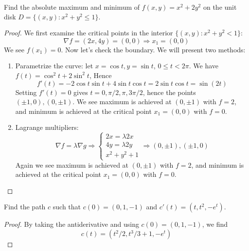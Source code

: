 \documentclass[openany]{book}
\begin{document}


\begin{prob}
    Find the absolute maximum and minimum of $f(x,y)=x^2+2y^2$ on the unit disk $D=\{(x,y): x^2+y^2\leq 1\}$.
\end{prob}
\begin{proof}
    We first examine the critical points in the interior $\{(x,y): x^2+y^2<1\}$:
    \begin{equation*}
        \nabla f=(2x, 4y)=(0,0)\Rightarrow x_1=(0,0)
    \end{equation*}
    We see $f(x_1)=0$. Now let's check the boundary. We will present two methods:
    \begin{enumerate}
        \item Parametrize the curve: let $x=\cos t, y=\sin t$, $0\leq t<2\pi$. We have $f(t)=\cos^2t+2\sin^2 t$, Hence
        \begin{equation*}
            f'(t)=-2\cos t\sin t+4\sin t\cos t=2\sin t\cos t=\sin(2t)
        \end{equation*}
        Setting $f'(t)=0$ gives $t=0,\pi/2, \pi, 3\pi/2$, hence the points $(\pm 1, 0), (0,\pm 1)$.  We see maximum is achieved at $(0,\pm 1)$ with $f=2$, and minimum is achieved at the critical point $x_1=(0,0)$ with $f=0$.
        \item Lagrange multipliers: 
        \begin{equation*}
            \nabla f=\lambda\nabla g\Rightarrow\begin{cases}
                2x=\lambda 2x\\
                4y=\lambda 2y\\
                x^2+y^2+1
            \end{cases}\Rightarrow (0,\pm1), (\pm 1, 0)
        \end{equation*} 
        Again we see maximum is achieved at $(0,\pm 1)$ with $f=2$, and minimum is achieved at the critical point $x_1=(0,0)$ with $f=0$.
    \end{enumerate}
\end{proof}



\begin{prob}
    Find the path $c$ such that $c(0)=(0,1,-1)$ and $c'(t)=(t, t^2, -e^t)$.
\end{prob}
\begin{proof}
    By taking the antiderivative and using $c(0)=(0,1,-1)$, we find 
    \begin{equation*}
        c(t)=(t^2/2, t^3/3+1, -e^{t})
    \end{equation*}
\end{proof}
\end{document}
